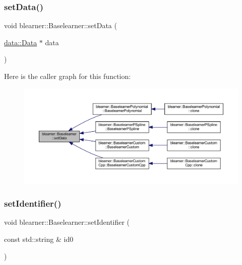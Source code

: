 \subsubsection{\texorpdfstring{set\+Data()}{setData()}}
{\footnotesize\ttfamily void blearner\+::\+Baselearner\+::set\+Data (\begin{DoxyParamCaption}\item[{\mbox{\hyperlink{classdata_1_1_data}{data\+::\+Data}} $\ast$}]{data }\end{DoxyParamCaption})}

Here is the caller graph for this function\+:\nopagebreak
\begin{figure}[H]
\begin{center}
\leavevmode
\includegraphics[width=350pt]{classblearner_1_1_baselearner_a29122c6125ef6ec03ad84602b3e2d0d4_icgraph}
\end{center}
\end{figure}
\mbox{\label{classblearner_1_1_baselearner_a6669906a481cbdd516dce8df6f6e5b76}} 
\subsubsection{\texorpdfstring{set\+Identifier()}{setIdentifier()}}
{\footnotesize\ttfamily void blearner\+::\+Baselearner\+::set\+Identifier (\begin{DoxyParamCaption}\item[{const std\+::string \&}]{id0 }\end{DoxyParamCaption})}

